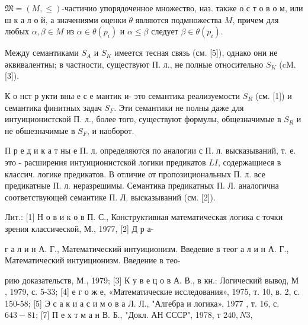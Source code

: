 \documentclass[10pt]{article}
\begin{document}
$\mathfrak{M}=(M, \leqslant)$-частичио упорядоченное множество, наз. также о с т о в о м, или ш к а л о й, а значениями оценки $\theta$ являются подмножества $M$, причем для любых $\alpha, \beta \in M$ из $\alpha \in \theta\left(p_{i}\right)$ и $\alpha \leqslant \beta$ следует $\beta \in \theta\left(p_{i}\right)$.



Между семантиками $S_{A}$ и $S_{K}$ имеется тесная связь (см. [5]), однако они не әквивалентны; в частности, существуют П. л., не полные относительно $S_{K}$ (cM. [3]).



К о нст р укти вны е с е мантик и- это семантика реализуемости $S_{R}$ (см. [1]) и семантика финитных задач $S_{F}$. Эти семантики не полны даже для интуиционистской П. л., более того, существуют формулы, общезначимые в $S_{R}$ и не обшезначимые в $S_{F}$, и наоборот.



П р е д и к а т ны е П. л. определяются по аналогии с П. л. высказываний, т. е. это - расширения интуиционистской логики предикатов $L I$, содержащиеся в классич. логике предикатов. В отличие от пропозициональных П. л. все предикатные П. л. неразрешимы. Семантика предикатных П. Л. аналогична соответствующей семантике П. Л. высказываний (см. [2]).



Лит.: [1] Н о в и к о в П. С., Конструктивная математическая логика с точки зрения классической, М., 1977, [2] Д р а-

г а л и н А. Г., Математический интуиционизм. Введевие в теог а л и н А. Г., Математический интуиционизм. Введение в тео-

рию доказательств, М., 1979; [3] К у в е ц о в А. В., в кн.: Логический вывод, М , 1979, с. 5-33; [4] е г о ж е, «Математические исследования», 1975, т. 10, в. 2, с. 150-58; [5] Э с а к и а с и м о в а Л. Л., "Алгебра и логика», 1977 , т. 16, с. $643-81$; [7] П е х т м а н В. Б., "Докл. АН СССР", 1978, т $240, \bar{N} 3$,
\end{document}
